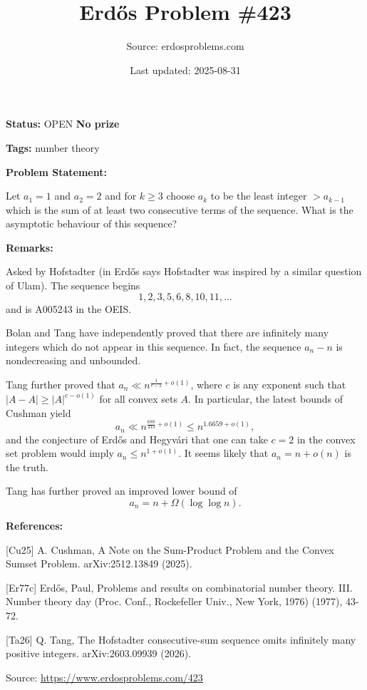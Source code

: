 \documentclass{article}
\title{Erd\H{o}s Problem \#423}
\date{Last updated: 2025-08-31}
\author{Source: erdosproblems.com}
\begin{document}
\maketitle

\noindent\textbf{Status:} OPEN \quad \textbf{No prize}

\noindent\textbf{Tags:} number theory

\medskip
\noindent\textbf{Problem Statement:}

Let $a_1=1$ and $a_2=2$ and for $k\geq 3$ choose $a_k$ to be the least integer $>a_{k-1}$ which is the sum of at least two consecutive terms of the sequence. What is the asymptotic behaviour of this sequence?

\bigskip
\noindent\textbf{Remarks:}

Asked by Hofstadter (in \cite{Er77c} Erd\H{o}s says Hofstadter was inspired by a similar question of Ulam). The sequence begins\[1,2,3,5,6,8,10,11,\ldots\]and is A005243 in the OEIS.

Bolan and Tang \cite{Ta26} have independently proved that there are infinitely many integers which do not appear in this sequence. In fact, the sequence $a_n-n$ is nondecreasing and unbounded.

Tang \cite{Ta26} further proved that $a_n \ll n^{\frac{1}{c-1}+o(1)}$, where $c$ is any exponent such that $\lvert A-A\rvert \geq \lvert A\rvert^{c-o(1)}$ for all convex sets $A$. In particular, the latest bounds of Cushman \cite{Cu25} yield\[a_n \ll n^{\frac{688}{413}+o(1)}\leq n^{1.6659+o(1)},\]and the conjecture of Erd\H{o}s and Hegyv\'{a}ri that one can take $c=2$ in the convex set problem would imply $a_n\leq n^{1+o(1)}$. It seems likely that $a_n=n+o(n)$ is the truth.

Tang has further proved an improved lower bound of\[a_n=n+\Omega(\log\log n).\]

\bigskip
\noindent\textbf{References:}

[Cu25] A. Cushman, A Note on the Sum-Product Problem and the Convex Sumset Problem. arXiv:2512.13849 (2025).
 
 [Er77c] Erd\H{o}s, Paul, Problems and results on combinatorial number theory. III. Number theory day (Proc. Conf., Rockefeller Univ.,
New York, 1976) (1977), 43-72.
 
 [Ta26] Q. Tang, The Hofstadter consecutive-sum sequence omits infinitely many positive integers. arXiv:2603.09939 (2026).

\bigskip
\noindent\small{Source: \url{https://www.erdosproblems.com/423}}
\end{document}

